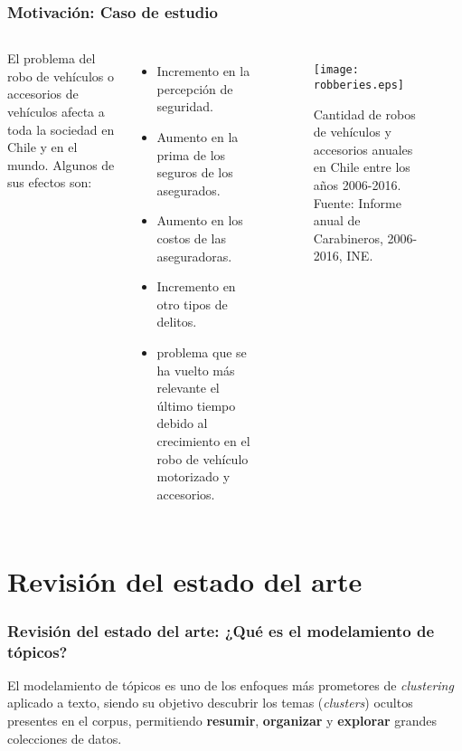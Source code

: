 \documentclass[
	spanish, %
	aspectratio=43, %
	hyperref={pdfencoding=auto,psdextra},
	xcolor={dvipsnames,table,usenames},
]{beamer}
\begin{document}
\begin{frame}[t]
\frametitle{Motivación: Caso de estudio} 

\begin{columns}

El problema del robo de vehículos o accesorios de vehículos afecta a toda la sociedad en Chile y en el mundo. Algunos de sus efectos son:

  \begin{itemize}
    \item Incremento en la percepción de seguridad.
    \item Aumento en la prima de los seguros de los asegurados.
    \item Aumento en los costos de las aseguradoras.
    \item Incremento en otro tipos de delitos.
    \item problema que se ha vuelto más relevante el último tiempo debido al crecimiento en el robo de vehículo motorizado y accesorios. 
  \end{itemize}
 
\begin{figure}
    \texttt{[image: robberies.eps]} 
    \caption{Cantidad de robos de vehículos y accesorios anuales en Chile entre los años 2006-2016. Fuente: Informe anual de Carabineros, 2006-2016, INE.} 
    \label{fig:antecedente}
\end{figure}

\end{columns}
\end{frame}




\section{Revisión del estado del arte}

\begin{frame}[t]
\frametitle{Revisión del estado del arte: ¿Qué es el modelamiento de tópicos?}
  El modelamiento de tópicos es uno de los enfoques más prometores de \textit{clustering} aplicado a texto, siendo su objetivo descubrir los temas (\textit{clusters}) ocultos presentes en el corpus, permitiendo \textbf{resumir}, \textbf{organizar} y \textbf{explorar} grandes colecciones de datos.

\begin{figure}
\end{figure}

\end{frame}
\end{document}
